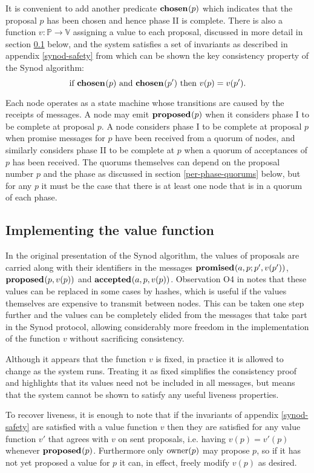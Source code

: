 \documentclass[journal]{IEEEtran}
\begin{document}
It is convenient to add another predicate $\mathbf{chosen}_{}(p)$ which indicates that
the proposal $p$ has been chosen and hence phase II is complete. There is also
a function $v : \mathbb P \to \mathbb V$ assigning a value to each proposal, discussed
in more detail in section \ref{value-function} below, and the system satisfies
a set of invariants as described in appendix \ref{synod-safety} from which can
be shown the key consistency property of the Synod algorithm: \[\textrm{if }
\mathbf{chosen}_{}(p) \textrm{ and } \mathbf{chosen}_{}(p') \textrm { then } v(p) = v(p').\]

Each node operates as a state machine whose transitions are caused by the
receipts of messages. A node may emit $\mathbf{proposed}_{}(p)$ when it considers phase I to
be complete at proposal $p$. A node considers phase I to be complete at
proposal $p$ when promise messages for $p$ have been received from a quorum of
nodes, and similarly considers phase II to be complete at $p$ when a quorum of
acceptances of $p$ has been received. The quorums themselves can depend on the
proposal number $p$ and the phase as discussed in section
\ref{per-phase-quorums} below, but for any $p$ it must be the case that there
is at least one node that is in a quorum of each phase.

\subsection{Implementing the value function}\label{value-function}

In the original presentation of the Synod algorithm, the values of proposals
are carried along with their identifiers in the messages $\mathbf{promised}_{}(a,p;
p',v(p') )$, $\mathbf{proposed}_{}( p,v(p))$ and $\mathbf{accepted}_{}(a, p,v(p) )$. Observation O4 in
\cite{cheap-paxos} notes that these values can be replaced in some cases by
hashes, which is useful if the values themselves are expensive to transmit
between nodes. This can be taken one step further and the values can be
completely elided from the messages that take part in the Synod protocol,
allowing considerably more freedom in the implementation of the function $v$
without sacrificing consistency.

Although it appears that the function $v$ is fixed, in practice it is allowed
to change as the system runs. Treating it as fixed simplifies the consistency
proof and highlights that its values need not be included in all messages, but
means that the system cannot be shown to satisfy any useful liveness
properties.

To recover liveness, it is enough to note that if the invariants of appendix
\ref{synod-safety} are satisfied with a value function $v$ then they are
satisfied for any value function $v'$ that agrees with $v$ on sent proposals,
i.e. having $v(p) = v'(p)$ whenever $\mathbf{proposed}_{}(p)$.  Furthermore only $\mathrm{owner}(p)$
may propose $p$, so if it has not yet proposed a value for $p$ it can, in
effect, freely modify $v(p)$ as desired.
\end{document}
